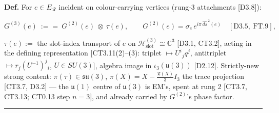 \begin{definition}\label{tag:Def-H-17}
\textbf{Def.} For $e\in E_{\mathcal R}$ incident on colour-carrying vertices (rung-3 attachments [D3.8]):

\[
G^{(3)}(e)\ :==\ G^{(2)}(e)\ \otimes\ \tau(e),\qquad
G^{(2)}(e)=\sigma_e\,e^{i\pi\,\widehat{ds}^{\,2}(e)}\quad[\mathrm{D3.5},\ \mathrm{FT.9}],
\]

$\tau(e):=$ the slot-index transport of $e$ on $\mathcal H^{(3)}_{\mathrm{slot}}\cong\mathbb C^3$ [D3.1, CT3.2], acting in the defining representation [CT3.11(2)–(3): triplet $\mapsto U^i{}_jq^j$, antitriplet $\mapsto r_j(U^{-1})^j{}_i$, $U\in SU(3)$], algebra image in $\iota_3(\mathfrak u(3))$ [D2.12]. Strictly-new strong content: $\pi(\tau)\in\mathfrak{su}(3)$, $\pi(X)=X-\tfrac{\mathfrak T(X)}{3}I_3$ the trace projection [CT3.7, D3.2] — the $\mathfrak u(1)$ centre of $\mathfrak u(3)$ is EM's, spent at rung 2 [CT3.7, CT3.13; CT0.13 step $n{=}3$], and already carried by $G^{(2)}$'s phase factor.

\vspace{2pt}\noindent\rule{\textwidth}{0.4pt}\vspace{2pt}

\end{definition}

